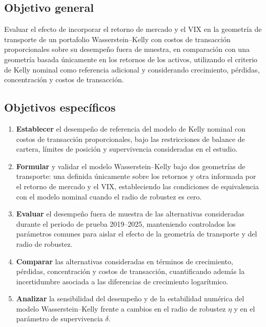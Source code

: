 \documentclass[11pt]{article}
\begin{document}
\subsection{Objetivo general}

Evaluar el efecto de incorporar el retorno de mercado y el VIX en la geometría de transporte de un portafolio Wasserstein–Kelly con costos de transacción proporcionales sobre su desempeño fuera de muestra, en comparación con una geometría basada únicamente en los retornos de los activos, utilizando el criterio de Kelly nominal como referencia adicional y considerando crecimiento, pérdidas, concentración y costos de transacción.

\subsection{Objetivos específicos}

\begin{enumerate}
    \item \textbf{Establecer} el desempeño de referencia del modelo de Kelly nominal con costos de transacción proporcionales, bajo las restricciones de balance de cartera, límites de posición y supervivencia consideradas en el estudio.
\item \textbf{Formular} y validar el modelo Wasserstein–Kelly bajo dos geometrías de transporte: una definida únicamente sobre los retornos y otra informada por el retorno de mercado y el VIX, estableciendo las condiciones de equivalencia con el modelo nominal cuando el radio de robustez es cero.

\item \textbf{Evaluar} el desempeño fuera de muestra de las alternativas consideradas durante el periodo de prueba 2019–2025, manteniendo controlados los parámetros comunes para aislar el efecto de la geometría de transporte y del radio de robustez.

\item \textbf{Comparar} las alternativas consideradas en términos de crecimiento, pérdidas, concentración y costos de transacción, cuantificando además la incertidumbre asociada a las diferencias de crecimiento logarítmico.


\item \textbf{Analizar} la sensibilidad del desempeño y de la estabilidad numérica del modelo Wasserstein–Kelly frente a cambios en el radio de robustez $\eta$ y en el parámetro de supervivencia $\delta$.

\end{enumerate}
\end{document}
